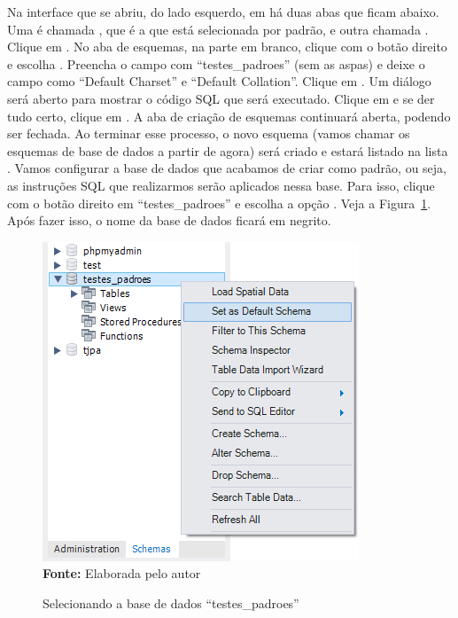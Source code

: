 Na interface que se abriu, do lado esquerdo, em  há duas abas que ficam abaixo. Uma é chamada , que é a que está selecionada por padrão, e outra chamada . Clique em . No aba de esquemas, na parte em branco, clique com o botão direito e escolha . Preencha o campo  com ``testes\_padroes'' (sem as aspas) e deixe o campo  como ``Default Charset'' e ``Default Collation''. Clique em . Um diálogo será aberto para mostrar o código SQL que será executado. Clique em  e se der tudo certo, clique em . A aba de criação de esquemas continuará aberta, podendo ser fechada. Ao terminar esse processo, o novo esquema (vamos chamar os esquemas de base de dados a partir de agora) será criado e estará listado na lista . Vamos configurar a base de dados que acabamos de criar como padrão, ou seja, as instruções SQL que realizarmos serão aplicados nessa base. Para isso, clique com o botão direito em ``testes\_padroes'' e escolha a opção . Veja a Figura~\ref{fig:cap04SelecionandoEsquema}. Após fazer isso, o nome da base de dados ficará em negrito.

\FloatBarrier
\begin{figure}[!htbp]
    \centering
    \caption{Selecionando a base de dados ``testes\_padroes''}
    \includegraphics[scale=0.8]{imagens/cap04SelecionandoEsquema}
    \\\textbf{Fonte:} Elaborada pelo autor
    \label{fig:cap04SelecionandoEsquema}
\end{figure}
\FloatBarrier

